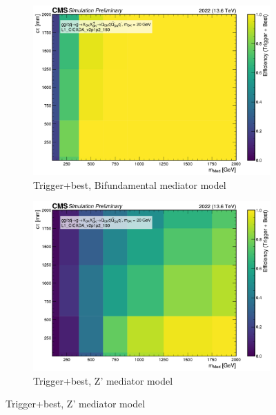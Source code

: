 \begin{figure}[h]
  \vspace{1em}

  \begin{subfigure}[t]{0.45\textwidth}
    \centering
    \includegraphics[width=\linewidth]{images/L1/ad_2D_tchan/trigeffplots2D_L1_efftype-trigplusbest_t-channel_mDark-20_L1_CICADA_v2p1p2_150_study_cloppear.pdf}
    \caption{Trigger+best, Bifundamental mediator model}
    \label{fig:cicada_trigplusbest_tchan}
  \end{subfigure}
  \hfill
  \begin{subfigure}[t]{0.45\textwidth}
    \centering
    \includegraphics[width=\linewidth]{images/L1/ad_2D_schan/trigeffplots2D_L1_efftype-trigplusbest_s-channel_mDark-20_L1_CICADA_v2p1p2_150_study_cloppear.pdf}
    \caption{Trigger+best, Z' mediator model}
    \label{fig:cicada_trigplusbest_schan}
  \end{subfigure}


\end{figure}

